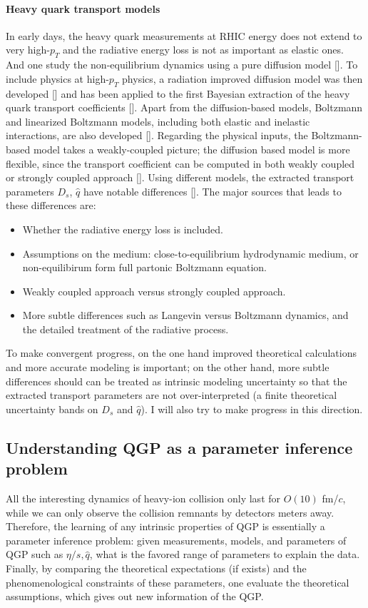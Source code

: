 \paragraph{Heavy quark transport models}
In early days, the heavy quark measurements at RHIC energy does not extend to very high-$p_T$ and the radiative energy loss is not as important as elastic ones.
And one study the non-equilibrium dynamics using a pure diffusion model []. 
To include physics at high-$p_T$ physics, a radiation improved diffusion model was then developed [] and has been applied to the first Bayesian extraction of the heavy quark transport coefficients [].
Apart from the diffusion-based models, Boltzmann and linearized Boltzmann models, including both elastic and inelastic interactions, are also developed [].
Regarding the physical inputs, the Boltzmann-based model takes a weakly-coupled picture; the diffusion based model is more flexible, since the transport coefficient can be computed in both weakly coupled or strongly coupled approach [].
Using different models, the extracted transport parameters $D_s$, $\hat{q}$ have notable differences [].
The major sources that leads to these differences are:
\begin{itemize}
\item Whether the radiative energy loss is included.
\item Assumptions on the medium: close-to-equilibrium hydrodynamic medium, or non-equilibirum form full partonic Boltzmann equation.
\item Weakly coupled approach versus strongly coupled approach.
\item More subtle differences such as Langevin versus Boltzmann dynamics, and the detailed treatment of the radiative process.
\end{itemize}
To make convergent progress, on the one hand improved theoretical calculations and more accurate modeling is important; on the other hand, more subtle differences should can be treated as intrinsic modeling uncertainty so that the extracted transport parameters are not over-interpreted (a finite theoretical uncertainty bands on $D_s$ and $\hat{q}$). 
I will also try to make progress in this direction.

\subsection{Understanding QGP as a parameter inference problem}
All the interesting dynamics of heavy-ion collision only last for $O(10) $ fm/$c$, while we can only observe the collision remnants by detectors meters away.
Therefore, the learning of any intrinsic properties of QGP is essentially  a parameter inference problem:
given measurements, models, and parameters of QGP such as $\eta/s, \hat{q}$, what is the favored range of parameters to explain the data.
Finally, by comparing the theoretical expectations (if exists) and the phenomenological constraints of these parameters, one evaluate the theoretical assumptions, which gives out new information of the QGP.

